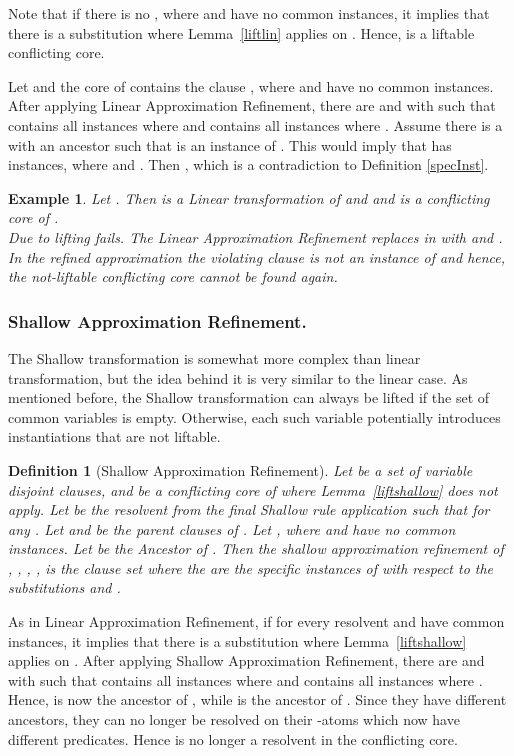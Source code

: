 \documentclass{llncs}
\newtheorem{defin}{Definition}
\newtheorem{exmp}{Example}
\begin{document}
Note that if there is no , where  and  have no common instances, 
it implies that there is a substitution 
where Lemma~\ref{liftlin} applies on . Hence,  is a liftable
conflicting core.

Let 
and the core  of  contains the clause , where  and  have no common instances.
After applying Linear Approximation Refinement, there are  and  with  such that   contains all instances where 
and  contains all instances where . 
Assume there is a  with an ancestor  such that  is an instance of .
This would imply that  has instances, where  and .
Then , which is a contradiction to Definition \ref{specInst}. 


\begin{exmp}\label{LinAbsEx}
Let  . 
Then   is a Linear transformation of  and
and    is a conflicting core of .\\
Due to  lifting fails.
The Linear Approximation Refinement replaces  in  with  and .
In the refined approximation  
the violating clause  is not an instance of  and hence, the not-liftable conflicting core  cannot be found again.
\end{exmp} 

\subsubsection{Shallow Approximation Refinement.}
The Shallow transformation is somewhat more complex than linear transformation, 
but the idea behind it is very similar to the linear case.
As mentioned before, the Shallow transformation can always be lifted 
if the set of common variables
 is empty. 
Otherwise, each such variable potentially 
introduces instantiations that are not liftable.

\begin{defin}[Shallow Approximation Refinement]
Let  be a set of variable disjoint clauses, 
 and
 be a conflicting core of  where Lemma~\ref{liftshallow} does not apply.
Let  be the resolvent from the final Shallow rule application such that  for any . 
Let  and  be the parent clauses of .
Let , where  and  have no common instances. 
Let  be the Ancestor of .
Then the \emph{shallow approximation refinement} of , , , ,  is the clause
set  where the  are the specific
instances of  with respect to the substitutions  and
.
\end{defin}

As in Linear Approximation Refinement, if for every resolvent    and  have common instances, it implies that there is a substitution 
where Lemma~\ref{liftshallow} applies on .
After applying Shallow Approximation Refinement, there are  and  with  such that   contains all instances where 
and  contains all instances where . 
Hence,  is now the ancestor of , while  is the ancestor of .
Since they have different ancestors, they can no longer be resolved on their -atoms which now have different predicates.
Hence  is no longer a resolvent in the conflicting  core.  
\end{document}
